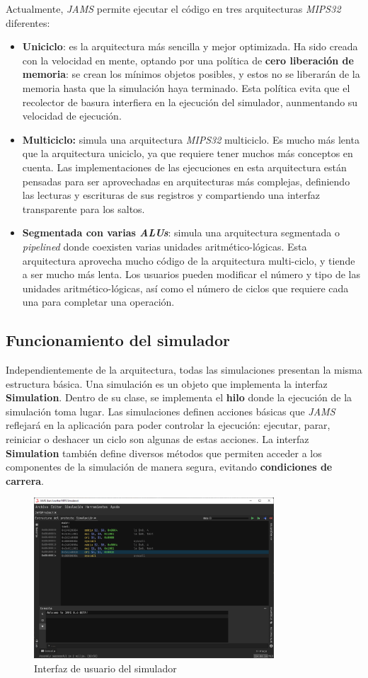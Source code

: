 Actualmente, \textit{JAMS} permite ejecutar el código
en tres arquitecturas \textit{MIPS32} diferentes:
\begin{itemize}
    \item \textbf{Uniciclo}: es la arquitectura más sencilla y
    mejor optimizada.
    Ha sido creada con la velocidad en mente, optando por una
    política de \textbf{cero liberación de memoria}: se crean los mínimos
    objetos posibles, y estos no se liberarán de la memoria hasta que
    la simulación haya terminado.
    Esta política evita que el recolector de basura interfiera en la
    ejecución del simulador, aunmentando su velocidad de ejecución.
    \item \textbf{Multiciclo:} simula una arquitectura
    \textit{MIPS32} multiciclo.
    Es mucho más lenta que la arquitectura uniciclo, ya que requiere
    tener muchos más conceptos en cuenta.
    Las implementaciones de las ejecuciones en esta arquitectura
    están pensadas para ser aprovechadas en arquitecturas más
    complejas, definiendo las lecturas y escrituras de sus
    registros y compartiendo una interfaz transparente para los saltos.
    \item \textbf{Segmentada con varias \textit{ALUs}}: simula
    una arquitectura segmentada o \textit{pipelined} donde coexisten varias
    unidades aritmético-lógicas.
    Esta arquitectura aprovecha mucho código de la arquitectura
    multi-ciclo, y tiende a ser mucho más lenta.
    Los usuarios pueden modificar el número y tipo de las unidades
    aritmético-lógicas, así como el número de ciclos que requiere
    cada una para completar una operación.
\end{itemize}

\subsection{Funcionamiento del simulador}\label{subsec:funcionamiento-del-simulador}

Independientemente de la arquitectura, todas las simulaciones presentan
la misma estructura básica.
Una simulación es un objeto que implementa la interfaz \textbf{Simulation}.
Dentro de su clase, se implementa el \textbf{hilo} donde la ejecución
de la simulación toma lugar.
Las simulaciones definen acciones básicas que \textit{JAMS} reflejará en la
aplicación para poder controlar la ejecución: ejecutar, parar, reiniciar
o deshacer un ciclo son algunas de estas acciones.
La interfaz \textbf{Simulation} también define diversos métodos
que permiten acceder a los componentes de la simulación de
manera segura, evitando \textbf{condiciones de carrera}.

\begin{figure}[H]
    \centering
    \includegraphics[width=0.8\textwidth]{images/mips/jams-simulation}
    \caption{Interfaz de usuario del simulador}
    \label{fig:jams-simulation}
\end{figure}